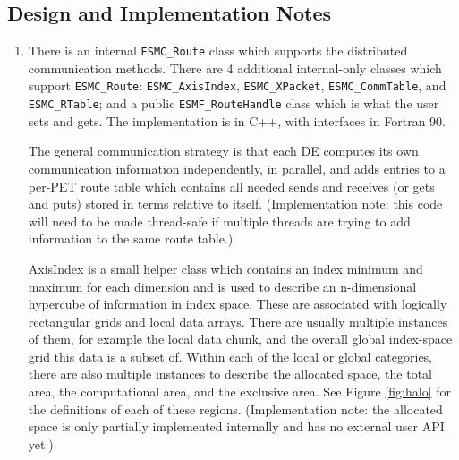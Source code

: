\subsection{Design and Implementation Notes}
\label{sec:routeimpl}

\begin{enumerate}

\item

There is an internal {\tt ESMC\_Route} class which supports the 
distributed communication methods.  There are 4 additional internal-only
classes which support {\tt ESMC\_Route}: {\tt ESMC\_AxisIndex}, 
{\tt ESMC\_XPacket}, {\tt ESMC\_CommTable}, and {\tt ESMC\_RTable};
and a public {\tt ESMF\_RouteHandle} class which is what the user 
sets and gets.  The implementation is in C++, with interfaces in Fortran 90.

The general communication strategy is that each
DE computes its own communication information independently,
in parallel, and adds entries to a per-PET route table
which contains all needed sends and receives (or gets and puts) 
stored in terms relative to itself.  (Implementation note: this
code will need to be made thread-safe if multiple threads are
trying to add information to the same route table.)

AxisIndex is a small helper class which contains an index minimum
and maximum for each dimension and is used to describe an n-dimensional
hypercube of information in index space.  These are associated with 
logically rectangular grids and local data arrays.  
There are usually multiple instances of them, for example the local
data chunk, and the overall global index-space grid this data is
a subset of.  Within each of the local or global categories, there are
also multiple instances to describe the allocated space, the total area,
the computational area, and the exclusive area.  See Figure \ref{fig:halo}
for the definitions of each of these regions.
(Implementation note: the allocated space is only partially implemented
internally and has no external user API yet.)


\end{enumerate}
